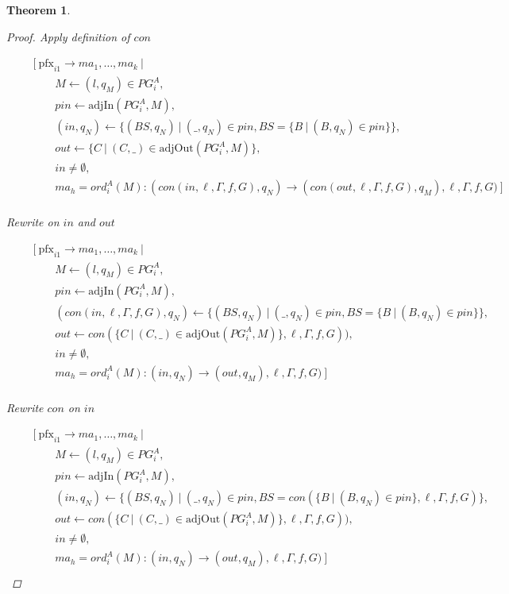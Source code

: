 \documentclass[twocolumn, openany]{sig-alternate-10pt}
\newcommand{\Pfx}{\mathrm{pfx}}%
\newtheorem{thm}{Theorem}
\begin{document}
\begin{thm}
\begin{proof}
  Apply definition of $con$

  \[ \begin{array}{l}
     ~~~~~~~~~ [~ \Pfx_{i1} \rightarrow ma_1, \dots, ma_k ~\vert~ \\
     ~~~~~~~~~~~~~~~~~~ M \leftarrow (l,q_M) \in PG^A_i, \\
     ~~~~~~~~~~~~~~~~~~ pin \leftarrow \text{adjIn}(PG^A_i,M), \\
     ~~~~~~~~~~~~~~~~~~ (in,q_N) \leftarrow \{ (BS,q_N) ~\vert~ (\_,q_N) \in pin, BS=\{B ~\vert~ (B,q_N) \in pin \} \}, \\
     ~~~~~~~~~~~~~~~~~~ out \leftarrow \{ C ~\vert~ (C,\_) \in \text{adjOut}(PG^A_i,M) \}, \\
     ~~~~~~~~~~~~~~~~~~ in \neq \emptyset, \\
     ~~~~~~~~~~~~~~~~~~ ma_h = ord^A_i(M) : (con(in,\ell,\Gamma,f,G),q_N) \rightarrow (con(out,\ell,\Gamma,f,G),q_M),\ell,\Gamma,f,G) ~] \\
  \end{array} \]%

  Rewrite on $in$ and $out$

  \[ \begin{array}{l}
     ~~~~~~~~~ [~ \Pfx_{i1} \rightarrow ma_1, \dots, ma_k ~\vert~ \\
     ~~~~~~~~~~~~~~~~~~ M \leftarrow (l,q_M) \in PG^A_i, \\
     ~~~~~~~~~~~~~~~~~~ pin \leftarrow \text{adjIn}(PG^A_i,M), \\
     ~~~~~~~~~~~~~~~~~~ (con(in,\ell,\Gamma,f,G),q_N) \leftarrow \{ (BS,q_N) ~\vert~ (\_,q_N) \in pin, BS=\{B ~\vert~ (B,q_N) \in pin \} \}, \\
     ~~~~~~~~~~~~~~~~~~ out \leftarrow con(\{ C ~\vert~ (C,\_) \in \text{adjOut}(PG^A_i,M) \},\ell,\Gamma,f,G)), \\
     ~~~~~~~~~~~~~~~~~~ in \neq \emptyset, \\
     ~~~~~~~~~~~~~~~~~~ ma_h = ord^A_i(M) : (in,q_N) \rightarrow (out,q_M),\ell,\Gamma,f,G) ~] \\
  \end{array} \]%

  Rewrite $con$ on $in$

  \[ \begin{array}{l}
     ~~~~~~~~~ [~ \Pfx_{i1} \rightarrow ma_1, \dots, ma_k ~\vert~ \\
     ~~~~~~~~~~~~~~~~~~ M \leftarrow (l,q_M) \in PG^A_i, \\
     ~~~~~~~~~~~~~~~~~~ pin \leftarrow \text{adjIn}(PG^A_i,M), \\
     ~~~~~~~~~~~~~~~~~~ (in,q_N) \leftarrow \{ (BS,q_N) ~\vert~ (\_,q_N) \in pin, BS=con(\{B ~\vert~ (B,q_N) \in pin \},\ell,\Gamma,f,G) \}, \\
     ~~~~~~~~~~~~~~~~~~ out \leftarrow con(\{ C ~\vert~ (C,\_) \in \text{adjOut}(PG^A_i,M) \},\ell,\Gamma,f,G)), \\
     ~~~~~~~~~~~~~~~~~~ in \neq \emptyset, \\
     ~~~~~~~~~~~~~~~~~~ ma_h = ord^A_i(M) : (in,q_N) \rightarrow (out,q_M),\ell,\Gamma,f,G) ~] \\
  \end{array} \]%


\end{proof}
\end{thm}
\end{document}
